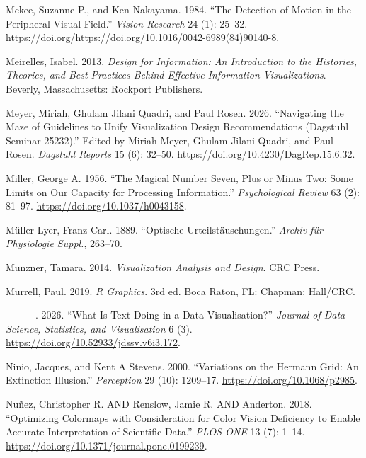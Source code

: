 \documentclass[
  letterpaper,
  DIV=11,
  numbers=noendperiod]{scrreprt}
\newlength{\cslhangindent}
\newenvironment{CSLReferences}[2] %
 {\begin{list}{}{%
  \setlength{\itemindent}{0pt}
  \setlength{\leftmargin}{0pt}
  \setlength{\parsep}{0pt}
  \ifodd #1
   \setlength{\leftmargin}{\cslhangindent}
   \setlength{\itemindent}{-1\cslhangindent}
  \fi
  \setlength{\itemsep}{#2\baselineskip}}}
 {\end{list}}
\begin{document}
\begin{CSLReferences}{1}{0}
Mckee, Suzanne P., and Ken Nakayama. 1984. {``The Detection of Motion in
the Peripheral Visual Field.''} \emph{Vision Research} 24 (1): 25--32.
https://doi.org/\url{https://doi.org/10.1016/0042-6989(84)90140-8}.

Meirelles, Isabel. 2013. \emph{Design for Information: An Introduction
to the Histories, Theories, and Best Practices Behind Effective
Information Visualizations}. Beverly, Massachusetts: Rockport
Publishers.

Meyer, Miriah, Ghulam Jilani Quadri, and Paul Rosen. 2026.
{``{Navigating the Maze of Guidelines to Unify Visualization Design
Recommendations (Dagstuhl Seminar 25232)}.''} Edited by Miriah Meyer,
Ghulam Jilani Quadri, and Paul Rosen. \emph{Dagstuhl Reports} 15 (6):
32--50. \url{https://doi.org/10.4230/DagRep.15.6.32}.

Miller, George A. 1956. {``The Magical Number Seven, Plus or Minus Two:
Some Limits on Our Capacity for Processing Information.''}
\emph{Psychological Review} 63 (2): 81--97.
\url{https://doi.org/10.1037/h0043158}.

Müller-Lyer, Franz Carl. 1889. {``Optische Urteilst{ä}uschungen.''}
\emph{Archiv f{ü}r Physiologie Suppl.}, 263--70.

Munzner, Tamara. 2014. \emph{Visualization Analysis and Design}. CRC
Press.

Murrell, Paul. 2019. \emph{R Graphics}. 3rd ed. Boca Raton, FL: Chapman;
Hall/CRC.

---------. 2026. {``What Is Text Doing in a Data Visualisation?''}
\emph{Journal of Data Science, Statistics, and Visualisation} 6 (3).
\url{https://doi.org/10.52933/jdssv.v6i3.172}.

Ninio, Jacques, and Kent A Stevens. 2000. {``Variations on the Hermann
Grid: An Extinction Illusion.''} \emph{Perception} 29 (10): 1209--17.
\url{https://doi.org/10.1068/p2985}.

Nuñez, Christopher R. AND Renslow, Jamie R. AND Anderton. 2018.
{``Optimizing Colormaps with Consideration for Color Vision Deficiency
to Enable Accurate Interpretation of Scientific Data.''} \emph{PLOS ONE}
13 (7): 1--14. \url{https://doi.org/10.1371/journal.pone.0199239}.


\end{CSLReferences}
\end{document}
